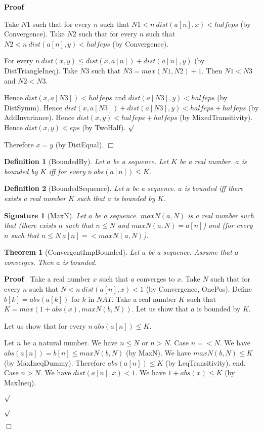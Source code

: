 \documentclass{article}
\newenvironment{forthel}{\begin{leftbar}}{\end{leftbar}}
\newenvironment{proof}{\noindent\textbf{Proof\ }}{\hspace*{\fill}$\Box$\medskip}
\newenvironment{subproof}{\begin{list}{}{}
		\item[\text{Proof}]}{\hfill $\surd$ \end{list}}
\newtheorem{theorem}{Theorem}
\newtheorem{definition}{Definition}
\newtheorem{signature}{Signature}
\begin{document}
\begin{forthel}
\begin{proof}
\begin{subproof}
	Take $N1$ such that for every $n$ such that $N1 < n \ dist(a[n],x) < halfeps$ (by Convergence).
	Take $N2$ such that for every $n$ such that $N2 < n \ dist(a[n],y) < halfeps$ (by Convergence).
	
	For every $n \ dist(x,y) \leq dist(x,a[n]) + dist(a[n],y)$ (by DistTriangleIneq). 
	Take $N3$ such that $N3 = max(N1,N2) + 1$.
	Then $N1 < N3$ and $N2 < N3$.
	
	Hence $dist(x,a[N3]) < halfeps$ and $dist(a[N3],y) < halfeps$ (by DistSymm).
	Hence $dist(x,a[N3]) + dist(a[N3],y) < halfeps + halfeps$ (by AddInvariance).
	Hence $dist(x,y) < halfeps + halfeps$ (by MixedTransitivity).
	Hence $dist(x,y) < eps$ (by TwoHalf).
	\end{subproof}
	Therefore $x = y$ (by DistEqual).
	\end{proof}
	
	\begin{definition} [BoundedBy]
	Let $a$ be a sequence. Let $K$ be a real number. $a$ is bounded by $K$ iff
	for every $n \ abs(a[n]) \leq K$.
	\end{definition}
	
	\begin{definition} [BoundedSequence]
	Let $a$ be a sequence. $a$ is bounded iff there exists a real number $K$ such that
	$a$ is bounded by $K$.
	\end{definition}
	
	\begin{signature} [MaxN]
	Let $a$ be a sequence. $maxN(a,N)$ is a real number such that
	(there exists $n$ such that $n \leq N$ and $maxN(a,N) = a[n]$) and
	(for every $n$ such that $n \leq N \ a[n] =< maxN(a,N)$).
	\end{signature}
	
	\begin{theorem} [ConvergentImpBounded]
	Let $a$ be a sequence. Assume that $a$ converges. Then $a$ is bounded.
	\end{theorem}
	\begin{proof}
	Take a real number $x$ such that $a$ converges to $x$.
	Take $N$ such that for every $n$ such that $N < n \ dist(a[n],x) < 1$ (by Convergence, OnePos).
	Define $b[k] = abs(a[k])$ for $k$ in $NAT$.
	Take a real number $K$ such that $K = max(1 + abs(x), maxN(b,N))$.
	Let us show that $a$ is bounded by $K$.
	\begin{subproof}
	Let us show that for every $n \ abs(a[n]) \leq K$.
	\begin{subproof} 
	Let $n$ be a natural number.
	We have $n \leq N$ or $n > N$.
	Case $n =< N$.
	We have $abs(a[n]) = b[n] \leq maxN(b,N)$ (by MaxN).
	We have $maxN(b,N) \leq K$ (by MaxIneqDummy).
	Therefore $abs(a[n]) \leq K$ (by LeqTransitivity).
	end.
	Case $n > N$.
	We have $dist(a[n],x) < 1$.
	We have $1 + abs(x) \leq K$ (by MaxIneq).
	

\end{subproof}
\end{subproof}
\end{proof}
\end{forthel}
\end{document}
